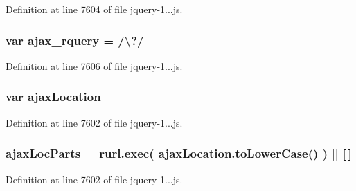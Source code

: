 Definition at line 7604 of file jquery-\/1...\+js.

\hypertarget{_scripts_2jquery-1_810_82_8js_a4da85c0011217bf1643139dc23999c5c}{}
\subsubsection[{ajax\+\_\+rquery}]{\setlength{\rightskip}{0pt plus 5cm}var ajax\+\_\+rquery = /\textbackslash{}?/}\label{_scripts_2jquery-1_810_82_8js_a4da85c0011217bf1643139dc23999c5c}


Definition at line 7606 of file jquery-\/1...\+js.

\hypertarget{_scripts_2jquery-1_810_82_8js_a1661d4e1676e7c6ffde5a3cb8d8ae246}{}
\subsubsection[{ajax\+Location}]{\setlength{\rightskip}{0pt plus 5cm}var ajax\+Location}\label{_scripts_2jquery-1_810_82_8js_a1661d4e1676e7c6ffde5a3cb8d8ae246}


Definition at line 7602 of file jquery-\/1...\+js.

\hypertarget{_scripts_2jquery-1_810_82_8js_a4c35110da3c335cfca38505ee65a5e79}{}
\subsubsection[{ajax\+Loc\+Parts}]{\setlength{\rightskip}{0pt plus 5cm}ajax\+Loc\+Parts = rurl.\+exec( ajax\+Location.\+to\+Lower\+Case() ) $\vert$$\vert$ \mbox{[}$\,$\mbox{]}}\label{_scripts_2jquery-1_810_82_8js_a4c35110da3c335cfca38505ee65a5e79}


Definition at line 7602 of file jquery-\/1...\+js.

\hypertarget{_scripts_2jquery-1_810_82_8js_a2d6199559f6d1e840af674910a329b04}{}
